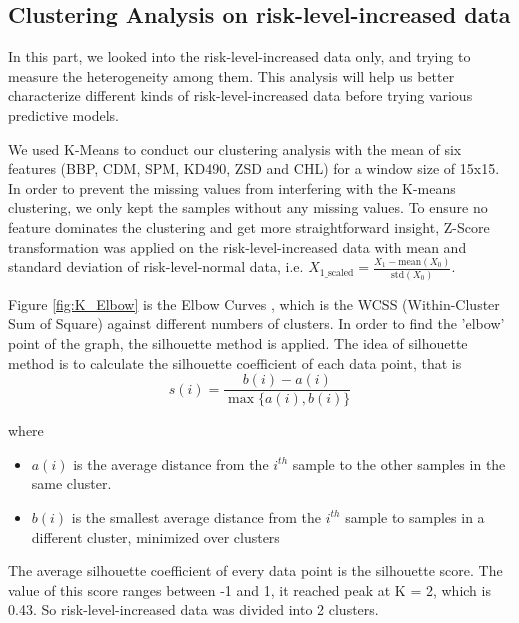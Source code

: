 \documentclass[a4paper,11pt]{report}
\begin{document}
\subsection{Clustering Analysis on risk-level-increased data}
\label{sec:clustering}
In this part, we looked into the risk-level-increased data only, and trying to measure the heterogeneity among them. This analysis will help us better characterize different kinds of risk-level-increased data before trying various predictive models.

We used K-Means to conduct our clustering analysis with the mean of six features (BBP, CDM, SPM, KD490, ZSD and CHL) for a window size of 15x15. In order to prevent the missing values from interfering with the K-means clustering, we only kept the samples without any missing values. To ensure no feature dominates the clustering and get more straightforward insight, Z-Score transformation was applied on the risk-level-increased data with mean and standard deviation of risk-level-normal data, i.e. $ X_{1 \text{\_scaled}} = \frac{X_{1} - \text{mean}(X_{0})}{\text{std}(X_{0})}$.

Figure \ref{fig:K_Elbow} is the Elbow Curves \citep{kodinariya2013review}, which is the WCSS (Within-Cluster Sum of Square) against different numbers of clusters. In order to find the 'elbow' point of the graph, the silhouette method is applied. The idea of silhouette method \citep{kodinariya2013review} is to calculate the silhouette coefficient of each data point, that is 
\begin{equation}
s(i) = \frac{b(i) - a(i)}{\max\{a(i), b(i)\}}
\end{equation} 

where
\begin{itemize}
\item $a(i)$ is the average distance from the $i^{th}$ sample to the other samples in the same cluster. 
\item $b(i)$ is the smallest average distance from the $i^{th}$ sample to samples in a different cluster, minimized over clusters
\end{itemize} 

The average silhouette coefficient of every data point is the silhouette score. The value of this score ranges between -1 and 1, it reached peak at K = 2, which is 0.43. So risk-level-increased data was divided into 2 clusters. 
\end{document}
